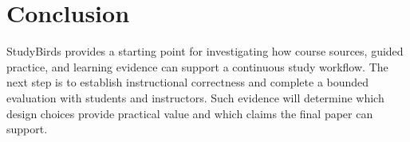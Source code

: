 \section{Conclusion}

StudyBirds provides a starting point for investigating how course sources,
guided practice, and learning evidence can support a continuous study
workflow. The next step is to establish instructional correctness and
complete a bounded evaluation with students and instructors. Such
evidence will determine which design choices provide practical value
and which claims the final paper can support.
